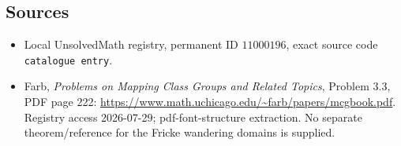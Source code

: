 \documentclass[11pt]{article}
\begin{document}
\subsection{Sources}
\begin{itemize}
\item Local UnsolvedMath registry, permanent ID \(11000196\), exact source code \texttt{catalogue entry}.
\item Farb, \emph{Problems on Mapping Class Groups and Related Topics}, Problem 3.3, PDF page 222: \url{https://www.math.uchicago.edu/~farb/papers/mcgbook.pdf}. Registry access 2026-07-29; pdf-font-structure extraction. No separate theorem/reference for the Fricke wandering domains is supplied.
\end{itemize}
\end{document}
